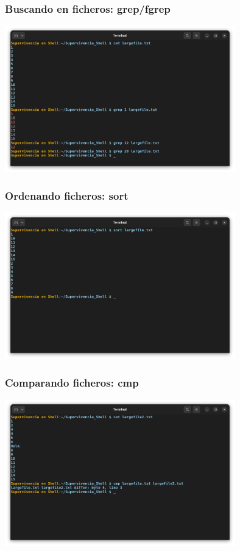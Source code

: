 \documentclass[10pt]{beamer}
\begin{document}
	\begin{frame}
		\frametitle{Buscando en ficheros: grep/fgrep}
		\includegraphics[width=0.75\textwidth]{grep}
	\end{frame}
	
	\begin{frame}
		\frametitle{Ordenando ficheros: sort}
		\includegraphics[width=0.75\textwidth]{sort}
	\end{frame}
		
	\begin{frame}
		\frametitle{Comparando ficheros: cmp}
		\includegraphics[width=0.75\textwidth]{cmp}
	\end{frame}
	
\end{document}

